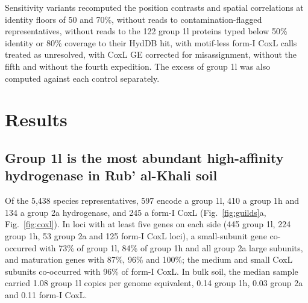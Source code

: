 \documentclass[11pt]{article}
\begin{document}
Sensitivity variants recomputed the position contrasts and spatial correlations at identity floors of 50
and 70\%, without reads to contamination-flagged representatives, without reads to the 122 group 1l
proteins typed below 50\% identity or 80\% coverage to their HydDB hit, with motif-less form-I CoxL calls
treated as unresolved, with CoxL GE corrected for misassignment, without the fifth and without the fourth
expedition. The excess of group 1l was also computed against each control separately.

\section*{Results}

\subsection*{Group 1l is the most abundant high-affinity hydrogenase in Rub' al-Khali soil}
Of the 5{,}438 species representatives, 597 encode a group 1l, 410 a group 1h and
134 a group 2a hydrogenase, and 245 a form-I CoxL (Fig.~\ref{fig:guilds}a,
Fig.~\ref{fig:coxl}). In loci with at least five genes on each side (445 group 1l, 224 group 1h, 53 group 2a
and 125 form-I CoxL loci), a small-subunit gene co-occurred with 73\% of group 1l, 84\% of group 1h and all
group 2a large subunits, and maturation genes with 87\%, 96\% and 100\%; the medium and small CoxL subunits
co-occurred with 96\% of form-I CoxL. In bulk soil, the median sample carried 1.08 group 1l copies per genome
equivalent, 0.14 group 1h, 0.03 group 2a and 0.11 form-I CoxL.
\end{document}
